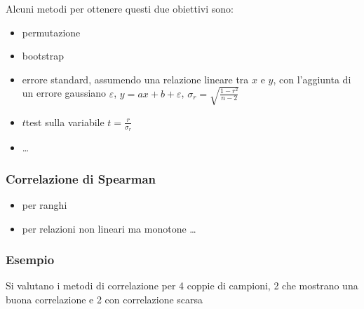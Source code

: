 \documentclass[letterpaper,10pt,italian]{jupyterBook}
\begin{document}
\sphinxAtStartPar
Alcuni metodi per ottenere questi due obiettivi sono:
\begin{itemize}
\item {} 
\sphinxAtStartPar
permutazione

\item {} 
\sphinxAtStartPar
bootstrap

\item {} 
\sphinxAtStartPar
errore standard, assumendo una relazione lineare tra \(x\) e \(y\), con l’aggiunta di un errore gaussiano \(\varepsilon\), \(y = a x + b + \varepsilon\), \(\sigma_r = \sqrt{\frac{1-r^2}{n-2}}\)

\item {} 
\sphinxAtStartPar
\(t\)\sphinxhyphen{}test sulla variabile \(t = \frac{r}{\sigma_r}\)

\item {} 
\sphinxAtStartPar
…

\end{itemize}


\subsubsection{Correlazione di Spearman}
\label{\detokenize{ch/statistics/hp-test-correlation:correlazione-di-spearman}}\begin{itemize}
\item {} 
\sphinxAtStartPar
per ranghi

\item {} 
\sphinxAtStartPar
per relazioni non lineari ma monotone
… 

\end{itemize}


\subsubsection{Esempio}
\label{\detokenize{ch/statistics/hp-test-correlation:esempio}}
\sphinxAtStartPar
Si valutano i metodi di correlazione per 4 coppie di campioni, 2 che mostrano una buona correlazione e 2 con correlazione scarsa
\end{document}
